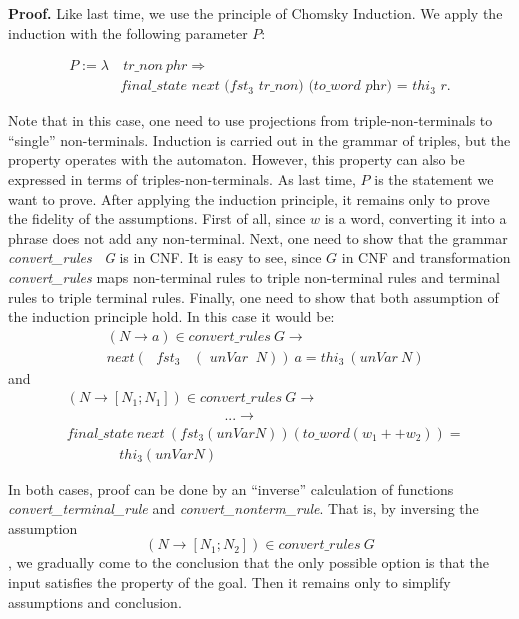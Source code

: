 \textbf{Proof.} 
Like last time, we use the principle of Chomsky Induction.
We apply the induction with the following parameter $P$:

\begin{align*}
P :=  \lambda & \ \textit{tr\_non} \ phr \Rightarrow  \\
              & \textit{final\_state} \textit{\ next \ ($fst_3$ tr\_non) (to\_word \ phr) = $thi_3$ r}. 
\end{align*}

Note that in this case, one need to use projections from triple-non-terminals to ``single'' non-terminals. Induction is carried out in the grammar of triples, but the property operates with the automaton. However, this property can also be expressed in terms of triples-non-terminals.
As last time, $P$ is the statement we want to prove.
After applying the induction principle, it remains only to prove the fidelity of the assumptions.
First of all, since $ w $ is a word, converting it into a phrase does not add any non-terminal.
Next, one need to show that the grammar \textit{convert\_rules \ G} is in CNF. It is easy to see, since $G$ in CNF and transformation \textit{convert\_rules} maps non-terminal rules to triple non-terminal rules and terminal rules to triple terminal rules.
Finally, one need to show that both assumption of the induction principle hold.  
In this case it would be: 
\begin{align*}
& (N \to a) \in \textit{convert\_rules} \ G \to \ \ \ \ \ \ \ \ \ \ \ \ \ \ \ \ \ \ \ \ \ \ \ \\
& next (\textit{ $fst_{3}$ } \ (\textit{ unVar } \ N)) \ a = \textit{$thi_3$} \ (\textit{unVar} \ N) 
\end{align*}
and 
\begin{align*}
& (N \to [N_1; N_1]) \in \textit{convert\_rules} \ G  \to \\
& \ \ \ \ \ \ \ \ \ \ \ \ \ \ \ \ \ \ \ \ \ \ \ \ \ \ \ \ \ \ \ \ \ \ \ \ \ \ \ \ \ \ \ \ \ \ \ \ \ \ \ ... \to \\
& \textit{final\_state} \ \textit{next} \ (fst_3 (unVar N)) (to\_word (w_1 ++ w_2)) = \\
& \ \ \ \ \ \ \ \ \ \ \ \ \ \ \ \ \ thi_3 (unVar N)
\end{align*}

In both cases, proof can be done by an ``inverse'' calculation of functions \textit{convert\_terminal\_rule} and \textit{convert\_nonterm\_rule}. 
That is, by inversing the assumption $$ (N \to [N_1; N_2]) \in \textit{convert\_rules} \ G$$, we gradually come to the conclusion that the only possible option is that the input satisfies the property of the goal. Then it remains only to simplify assumptions and conclusion.


